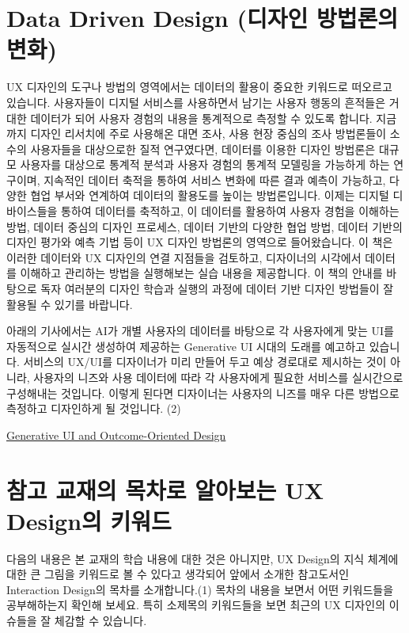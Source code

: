 \documentclass[
  letterpaper,
]{book}
\begin{document}
\section{Data Driven Design (디자인 방법론의
변화)}\label{data-driven-design-uxb514uxc790uxc778-uxbc29uxbc95uxb860uxc758-uxbcc0uxd654}

UX 디자인의 도구나 방법의 영역에서는 데이터의 활용이 중요한 키워드로
떠오르고 있습니다. 사용자들이 디지털 서비스를 사용하면서 남기는 사용자
행동의 흔적들은 거대한 데이터가 되어 사용자 경험의 내용을 통계적으로
측정할 수 있도록 합니다. 지금까지 디자인 리서치에 주로 사용해온 대면
조사, 사용 현장 중심의 조사 방법론들이 소수의 사용자들을 대상으로한 질적
연구였다면, 데이터를 이용한 디자인 방법론은 대규모 사용자를 대상으로
통계적 분석과 사용자 경험의 통계적 모델링을 가능하게 하는 연구이며,
지속적인 데이터 축적을 통하여 서비스 변화에 따른 결과 예측이 가능하고,
다양한 협업 부서와 연계하여 데이터의 활용도를 높이는 방법론입니다.
이제는 디지털 디바이스들을 통하여 데이터를 축적하고, 이 데이터를
활용하여 사용자 경험을 이해하는 방법, 데이터 중심의 디자인 프로세스,
데이터 기반의 다양한 협업 방법, 데이터 기반의 디자인 평가와 예측 기법
등이 UX 디자인 방법론의 영역으로 들어왔습니다. 이 책은 이러한 데이터와
UX 디자인의 연결 지점들을 검토하고, 디자이너의 시각에서 데이터를
이해하고 관리하는 방법을 실행해보는 실습 내용을 제공합니다. 이 책의
안내를 바탕으로 독자 여러분의 디자인 학습과 실행의 과정에 데이터 기반
디자인 방법들이 잘 활용될 수 있기를 바랍니다.

아래의 기사에서는 AI가 개별 사용자의 데이터를 바탕으로 각 사용자에게
맞는 UI를 자동적으로 실시간 생성하여 제공하는 Generative UI 시대의
도래를 예고하고 있습니다. 서비스의 UX/UI를 디자이너가 미리 만들어 두고
예상 경로대로 제시하는 것이 아니라, 사용자의 니즈와 사용 데이터에 따라
각 사용자에게 필요한 서비스를 실시간으로 구성해내는 것입니다. 이렇게
된다면 디자이너는 사용자의 니즈를 매우 다른 방법으로 측정하고 디자인하게
될 것입니다. (2)

\href{https://www.nngroup.com/articles/generative-ui/}{Generative UI and
Outcome-Oriented Design}

\section{참고 교재의 목차로 알아보는 UX Design의
키워드}\label{uxcc38uxace0-uxad50uxc7acuxc758-uxbaa9uxcc28uxb85c-uxc54cuxc544uxbcf4uxb294-ux-designuxc758-uxd0a4uxc6ccuxb4dc}

다음의 내용은 본 교재의 학습 내용에 대한 것은 아니지만, UX Design의 지식
체계에 대한 큰 그림을 키워드로 볼 수 있다고 생각되어 앞에서 소개한
참고도서인 Interaction Design의 목차를 소개합니다.(1) 목차의 내용을
보면서 어떤 키워드들을 공부해하는지 확인해 보세요. 특히 소제목의
키워드들을 보면 최근의 UX 디자인의 이슈들을 잘 체감할 수 있습니다.
\end{document}

